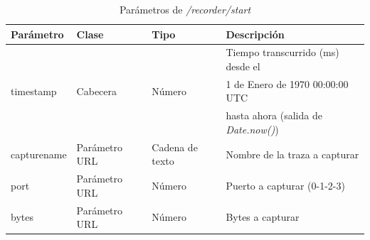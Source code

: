 \begin{table}[H]
\centering
\begin{tabular}{|l|l|l|l|}
\hline
\rowcolor[HTML]{F5F5F5}
\textbf{Parámetro}  & \textbf{Clase} & \textbf{Tipo}   & \textbf{Descripción}                         \\ \hline
                    &                &                 & Tiempo transcurrido (ms) desde el            \\
timestamp           & Cabecera       & Número          & 1 de Enero de 1970 00:00:00 UTC              \\
                    &                &                 & hasta ahora (salida de \textit{Date.now()})  \\ \hline
capturename         & Parámetro URL  & Cadena de texto & Nombre de la \gls{traza} a capturar          \\ \hline
port                & Parámetro URL  & Número          & Puerto a capturar (0-1-2-3)                  \\ \hline
bytes               & Parámetro URL  & Número          & Bytes a capturar                             \\ \hline
\end{tabular}
\caption{Parámetros de \textit{/recorder/start}}
\label{extra:api:recorderstart:invocacion}
\end{table}

